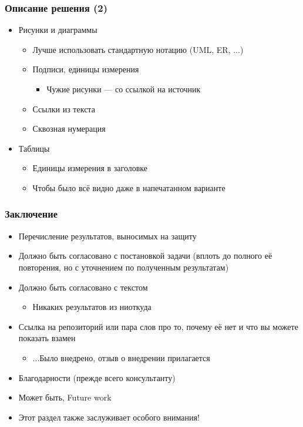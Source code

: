 \documentclass[xetex,mathserif,serif]{beamer}
\begin{document}
    \begin{frame}
        \frametitle{Описание решения (2)}
        \begin{itemize}
            \item Рисунки и диаграммы
            \begin{itemize}
                \item Лучше использовать стандартную нотацию (UML, ER, ...)
                \item Подписи, единицы измерения
                \begin{itemize}
                    \item Чужие рисунки --- со ссылкой на источник
                \end{itemize}
                \item Ссылки из текста
                \item Сквозная нумерация
            \end{itemize}
            \item Таблицы
            \begin{itemize}
                \item Единицы измерения в заголовке
                \item Чтобы было всё видно даже в напечатанном варианте
            \end{itemize}
        \end{itemize}
    \end{frame}

    \begin{frame}
        \frametitle{Заключение}
        \begin{itemize}
            \item Перечисление результатов, выносимых на защиту
            \item Должно быть согласовано с постановкой задачи (вплоть до полного её повторения, но с уточнением по полученным результатам)
            \item Должно быть согласовано с текстом
            \begin{itemize}
                \item Никаких результатов из ниоткуда
            \end{itemize}
            \item Ссылка на репозиторий или пара слов про то, почему её нет и что вы можете показать взамен
            \begin{itemize}
                \item ...Было внедрено, отзыв о внедрении прилагается
            \end{itemize}
            \item Благодарности (прежде всего консультанту)
            \item Может быть, Future work
            \item Этот раздел также заслуживает особого внимания!
        \end{itemize}
    \end{frame}
\end{document}
